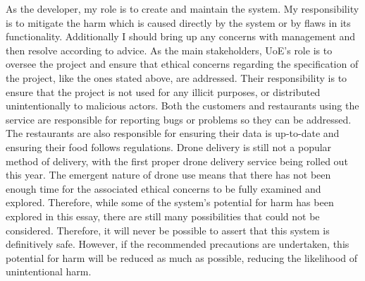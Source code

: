 \documentclass{article}
\begin{document}
As the developer, my role is to create and maintain the system. 
My responsibility is to mitigate the harm which is caused directly by the system or by flaws in its functionality.
Additionally I should bring up any concerns with management and then resolve according to advice.
As the main stakeholders, UoE's role is to oversee the project and ensure that ethical concerns regarding the specification of the project, like the ones stated above, are addressed.
Their responsibility is to ensure that the project is not used for any illicit purposes, or distributed unintentionally to malicious actors. 
Both the customers and restaurants using the service are responsible for reporting bugs or problems so they can be addressed. 
The restaurants are also responsible for ensuring their data is up-to-date and ensuring their food follows regulations.
\newline
\newline
Drone delivery is still not a popular method of delivery, with the first proper drone delivery service being rolled out this year\supercite{drone-delivery-royal-mail}. 
The emergent nature of drone use means that there has not been enough time for the associated ethical concerns to be fully examined and explored. 
Therefore, while some of the system's potential for harm has been explored in this essay, there are still many possibilities that could not be considered. 
Therefore, it will never be possible to assert that this system is definitively safe. 
However, if the recommended precautions are undertaken, this potential for harm will be reduced as much as possible, reducing the likelihood of unintentional harm. 
\printbibliography
\end{document}
